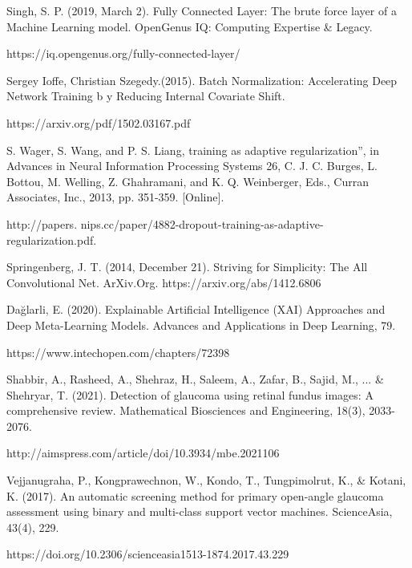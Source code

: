 \vspace{5mm}
\noindent[36] Singh, S. P. (2019, March 2). Fully Connected Layer: The brute force layer of a Machine Learning model. OpenGenus IQ: Computing Expertise & Legacy. 

\noindent https://iq.opengenus.org/fully-connected-layer/

\vspace{5mm}
\noindent[37] Sergey Ioffe, Christian Szegedy.(2015). Batch Normalization: Accelerating Deep Network Training b y Reducing Internal Covariate Shift. 

\noindent https://arxiv.org/pdf/1502.03167.pdf
 
\vspace{5mm} 
\noindent[38] S. Wager, S. Wang, and P. S. Liang, training as adaptive regularization”, in Advances in Neural Information Processing Systems 26, C. J. C. Burges, L. Bottou, M. Welling, Z. Ghahramani, and K. Q. Weinberger, Eds., Curran Associates, Inc., 2013, pp. 351-359. [Online].  

\noindent http://papers. nips.cc/paper/4882-dropout-training-as-adaptive-regularization.pdf.

\vspace{5mm}
\noindent[39] Springenberg, J. T. (2014, December 21). Striving for Simplicity: The All Convolutional Net. ArXiv.Org. https://arxiv.org/abs/1412.6806

\vspace{5mm}
\noindent[40] Dağlarli, E. (2020). Explainable Artificial Intelligence (XAI) Approaches and Deep Meta-Learning Models. Advances and Applications in Deep Learning, 79. 

\noindent https://www.intechopen.com/chapters/72398

\vspace{5mm}
\noindent[41] Shabbir, A., Rasheed, A., Shehraz, H., Saleem, A., Zafar, B., Sajid, M., ... & Shehryar, T. (2021). Detection of glaucoma using retinal fundus images: A comprehensive review. Mathematical Biosciences and Engineering, 18(3), 2033-2076. 

\noindent http://aimspress.com/article/doi/10.3934/mbe.2021106

\vspace{5mm}
\noindent[42] Vejjanugraha, P., Kongprawechnon, W., Kondo, T., Tungpimolrut, K., & Kotani, K. (2017). An automatic screening method for primary open-angle glaucoma assessment using binary and multi-class support vector machines. ScienceAsia, 43(4), 229. 

\noindent https://doi.org/10.2306/scienceasia1513-1874.2017.43.229